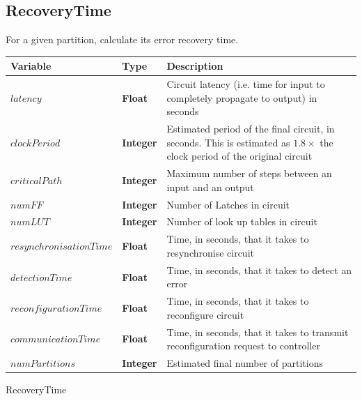 \documentclass[12pt,final,oneside]{dwThesis} %
\begin{document}
   \newpage 
   \subsection{RecoveryTime}
   For a given partition, calculate its
   error recovery time.  
   \begin{algorithm}

      \begin{center}


         \begin{tabularx}
            {\linewidth}{llX} \toprule Variable & Type &
            Description\\
            \midrule $latency$ &\textbf{ Float } &  Circuit
            latency (i.e. time for input to completely propagate to output) in
            seconds\\
            $clockPeriod$ &\textbf{ Integer } & Estimated period of
            the final circuit, in seconds. This is estimated as $1.8\times$ the
            clock period of the original circuit\\
            $criticalPath$ &\textbf{
               Integer } &  Maximum number of steps between an input and an
            output\\
            $numFF$ &\textbf{ Integer } &  Number of Latches in
            circuit\\
            $numLUT$ &\textbf{ Integer } &  Number of look up tables
            in circuit\\
            $resynchronisationTime$ &\textbf{ Float } &  Time, in
            seconds, that it takes to resynchronise circuit\\
            $detectionTime$
            &\textbf{ Float } &  Time, in seconds, that it takes to detect an
            error\\
            $reconfigurationTime$ &\textbf{ Float } &  Time, in
            seconds, that it takes to reconfigure circuit\\
            $communicationTime$
            &\textbf{ Float } &  Time, in seconds, that it takes to transmit
            reconfiguration request to controller\\
            $numPartitions$ &\textbf{
               Integer } &  Estimated final number of partitions \\
            \bottomrule

         \end{tabularx}

      \end{center}
      \caption{RecoveryTime}\label{recoverytime}


\end{algorithm}
\end{document}
